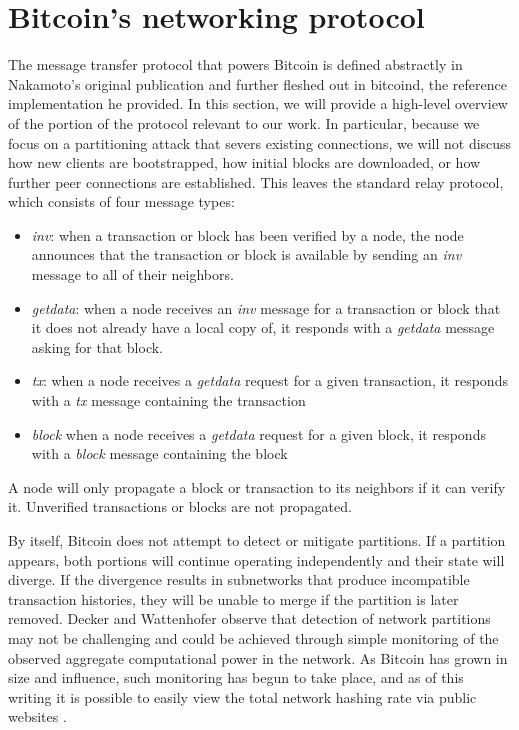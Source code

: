 \section{Bitcoin's networking protocol}
The message transfer protocol that powers Bitcoin is defined abstractly in Nakamoto's original publication \cite{Nakamoto} and further fleshed out in bitcoind, the reference implementation he provided. In this section, we will provide a high-level overview of the portion of the protocol relevant to our work. In particular, because we focus on a partitioning attack that severs existing connections, we will not discuss how new clients are bootstrapped, how initial blocks are downloaded, or how further peer connections are established. This leaves the standard relay protocol, which consists of four message types:

\begin{itemize}

\item \textit{inv}: when a transaction or block has been verified by a node, the node announces that the transaction or block is available by sending an \textit{inv} message to all of their neighbors.
\item \textit{getdata}: when a node receives an \textit{inv} message for a transaction or block that it does not already have a local copy of, it responds with a \textit{getdata} message asking for that block.
\item \textit{tx}: when a node receives a \textit{getdata} request for a given transaction, it responds with a \textit{tx} message containing the transaction
\item \textit{block} when a node receives a \textit{getdata} request for a given block, it responds with a \textit{block} message containing the block

\end{itemize}

A node will only propagate a block or transaction to its neighbors if it can verify it. Unverified transactions or blocks are not propagated.

By itself, Bitcoin does not attempt to detect or mitigate partitions. If a partition appears, both portions will continue operating independently and their state will diverge. If the divergence results in subnetworks that produce incompatible transaction histories, they will be unable to merge if the partition is later removed. Decker and Wattenhofer \cite{DeckerWattenhofer2013} observe that detection of network partitions may not be challenging and could be achieved through simple monitoring of the observed aggregate computational power in the network. As Bitcoin has grown in size and influence, such monitoring has begun to take place, and as of this writing it is possible to easily view the total network hashing rate via public websites \cite{sipa}.

